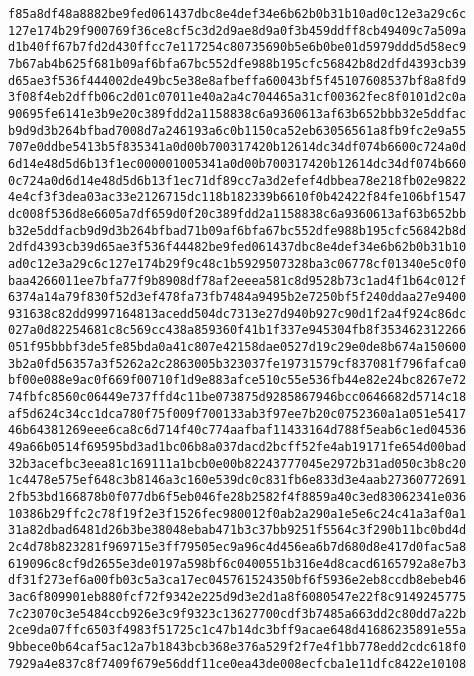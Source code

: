 \documentclass{article}
\begin{document}
{\begin{verbatim}
f85a8df48a8882be9fed061437dbc8e4def34e6b62b0b31b10ad0c12e3a29c6c
127e174b29f900769f36ce8cf5c3d2d9ae8d9a0f3b459ddff8cb49409c7a509a
d1b40ff67b7fd2d430ffcc7e117254c80735690b5e6b0be01d5979ddd5d58ec9
7b67ab4b625f681b09af6bfa67bc552dfe988b195cfc56842b8d2dfd4393cb39
d65ae3f536f444002de49bc5e38e8afbeffa60043bf5f45107608537bf8a8fd9
3f08f4eb2dffb06c2d01c07011e40a2a4c704465a31cf00362fec8f0101d2c0a
90695fe6141e3b9e20c389fdd2a1158838c6a9360613af63b652bbb32e5ddfac
b9d9d3b264bfbad7008d7a246193a6c0b1150ca52eb63056561a8fb9fc2e9a55
707e0ddbe5413b5f835341a0d00b700317420b12614dc34df074b6600c724a0d
6d14e48d5d6b13f1ec000001005341a0d00b700317420b12614dc34df074b660
0c724a0d6d14e48d5d6b13f1ec71df89cc7a3d2efef4dbbea78e218fb02e9822
4e4cf3f3dea03ac33e2126715dc118b182339b6610f0b42422f84fe106bf1547
dc008f536d8e6605a7df659d0f20c389fdd2a1158838c6a9360613af63b652bb
b32e5ddfacb9d9d3b264bfbad71b09af6bfa67bc552dfe988b195cfc56842b8d
2dfd4393cb39d65ae3f536f44482be9fed061437dbc8e4def34e6b62b0b31b10
ad0c12e3a29c6c127e174b29f9c48c1b5929507328ba3c06778cf01340e5c0f0
baa4266011ee7bfa77f9b8908df78af2eeea581c8d9528b73c1ad4f1b64c012f
6374a14a79f830f52d3ef478fa73fb7484a9495b2e7250bf5f240ddaa27e9400
931638c82dd9997164813acedd504dc7313e27d940b927c90d1f2a4f924c86dc
027a0d82254681c8c569cc438a859360f41b1f337e945304fb8f353462312266
051f95bbbf3de5fe85bda0a41c807e42158dae0527d19c29e0de8b674a150600
3b2a0fd56357a3f5262a2c2863005b323037fe19731579cf837081f796fafca0
bf00e088e9ac0f669f00710f1d9e883afce510c55e536fb44e82e24bc8267e72
74fbfc8560c06449e737ffd4c11be073875d9285867946bcc0646682d5714c18
af5d624c34cc1dca780f75f009f700133ab3f97ee7b20c0752360a1a051e5417
46b64381269eee6ca8c6d714f40c774aafbaf11433164d788f5eab6c1ed04536
49a66b0514f69595bd3ad1bc06b8a037dacd2bcff52fe4ab19171fe654d00bad
32b3acefbc3eea81c169111a1bcb0e00b82243777045e2972b31ad050c3b8c20
1c4478e575ef648c3b8146a3c160e539dc0c831fb6e833d3e4aab27360772691
2fb53bd166878b0f077db6f5eb046fe28b2582f4f8859a40c3ed83062341e036
10386b29ffc2c78f19f2e3f1526fec980012f0ab2a290a1e5e6c24c41a3af0a1
31a82dbad6481d26b3be38048ebab471b3c37bb9251f5564c3f290b11bc0bd4d
2c4d78b823281f969715e3ff79505ec9a96c4d456ea6b7d680d8e417d0fac5a8
619096c8cf9d2655e3de0197a598bf6c0400551b316e4d8cacd6165792a8e7b3
df31f273ef6a00fb03c5a3ca17ec045761524350bf6f5936e2eb8ccdb8ebeb46
3ac6f809901eb880fcf72f9342e225d9d3e2d1a8f6080547e22f8c9149245775
7c23070c3e5484ccb926e3c9f9323c13627700cdf3b7485a663dd2c80dd7a22b
2ce9da07ffc6503f4983f51725c1c47b14dc3bff9acae648d41686235891e55a
9bbece0b64caf5ac12a7b1843bcb368e376a529f2f7e4f1bb778edd2cdc618f0
7929a4e837c8f7409f679e56ddf11ce0ea43de008ecfcba1e11dfc8422e10108

\end{verbatim}}
\end{document}
